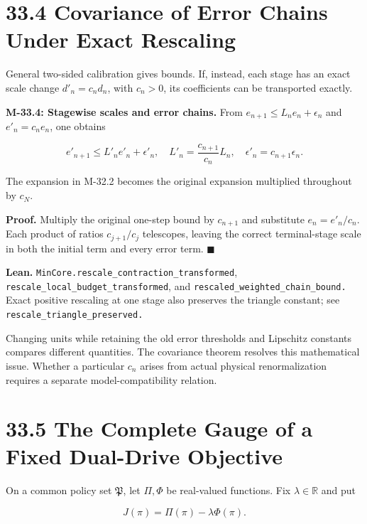 \documentclass[
  english,
  11pt,
  oneside]{book}
\begin{document}
\section{33.4 Covariance of Error Chains Under Exact Rescaling}\label{covariance-of-error-chains-under-exact-rescaling}

General two-sided calibration gives bounds. If, instead, each stage has an exact scale change \(d'_n=c_nd_n\), with \(c_n>0\), its coefficients can be transported exactly.

\hypertarget{m-33-4}{}\label{m-33-4}

\textbf{M-33.4: Stagewise scales and error chains.} From \(e_{n+1}\le L_ne_n+\epsilon_n\) and \(e'_n=c_ne_n\), one obtains

\[e'_{n+1}\le L'_ne'_n+\epsilon'_n,
\quad L'_n=\frac{c_{n+1}}{c_n}L_n,
\quad\epsilon'_n=c_{n+1}\epsilon_n.\]

The expansion in M-32.2 becomes the original expansion multiplied throughout by \(c_N\).

\textbf{Proof.} Multiply the original one-step bound by \(c_{n+1}\) and substitute \(e_n=e'_n/c_n\). Each product of ratios \(c_{j+1}/c_j\) telescopes, leaving the correct terminal-stage scale in both the initial term and every error term. \(\blacksquare\)

\textbf{Lean.} \nolinkurl{MinCore.rescale_contraction_transformed}, \nolinkurl{rescale_local_budget_transformed}, and \nolinkurl{rescaled_weighted_chain_bound.} Exact positive rescaling at one stage also preserves the triangle constant; see \nolinkurl{rescale_triangle_preserved.}

Changing units while retaining the old error thresholds and Lipschitz constants compares different quantities. The covariance theorem resolves this mathematical issue. Whether a particular \(c_n\) arises from actual physical renormalization requires a separate model-compatibility relation.

\section{33.5 The Complete Gauge of a Fixed Dual-Drive Objective}\label{the-complete-gauge-of-a-fixed-dual-drive-objective}

On a common policy set \(\mathfrak P\), let \(\Pi,\Phi\) be real-valued functions. Fix \(\lambda\in\mathbb R\) and put

\[J(\pi)=\Pi(\pi)-\lambda\Phi(\pi).\]

\hypertarget{m-33-5}{}\label{m-33-5}
\end{document}
